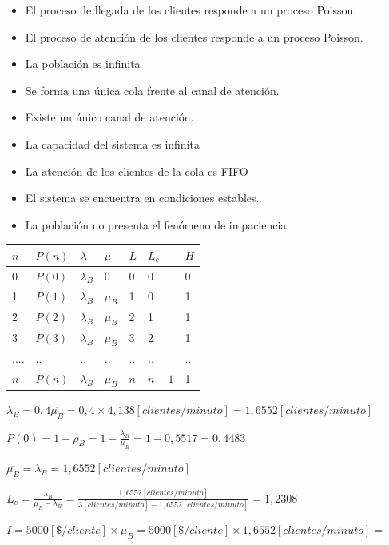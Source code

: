 \documentclass[a4paper,11pt]{article}
\begin{document}
\leftskip=36pt
\parindent=-18pt
\begin{itemize}
  \item El proceso de llegada de los clientes responde a un proceso Poisson.
  \item El proceso de atención de los clientes responde a un proceso Poisson.
  \item La población es infinita
  \item Se forma una única cola frente al canal de atención.
  \item Existe un único canal de atención.
  \item La capacidad del sistema es infinita
  \item La atención de los clientes de la cola es FIFO
  \item El sistema se encuentra en condiciones estables.
  \item La población no presenta el fenómeno de impaciencia.
\end{itemize}

\vspace{27pt}
\leftskip=0pt
\parindent=26pt
\begin{tabular}{|>{\raggedright}p{39pt}|>{\raggedright}p{39pt}|>{\raggedright}p{38pt}|>{\raggedright}p{39pt}|>{\raggedright}p{38pt}|>{\raggedright}p{38pt}|>{\raggedright}p{31pt}|}
\hline
$n$ & $P(n)$ & $\lambda$ & $\mu$ & $L$ & $L_c$ & $H$\tabularnewline
\hline
0 & $P(0)$ & $\lambda_B$ & 0 & 0 & 0 & 0\tabularnewline
\hline
1 & $P(1)$ & $\lambda_B$ & $\mu_B$ & 1 & 0 & 1\tabularnewline
\hline
2 & $P(2)$ & $\lambda_B$ & $\mu_B$ & 2 & 1 & 1\tabularnewline
\hline
3 & $P(3)$ & $\lambda_B$ & $\mu_B$ & 3 & 2 & 1\tabularnewline
\hline
.... & .. & .. & .. & .. & .. & ..\tabularnewline
\hline
$n$ & $P(n)$ & $\lambda_B$ & $\mu_B$ & $n$ & $n-1$ & 1\tabularnewline
\hline       
\end{tabular}

\vspace{13pt}
$\lambda_B = 0,4\overline{\mu_B} = 0,4 \times 4,138[clientes/minuto] = 1,6552[clientes/minuto]$

$P(0) = 1-\rho_B = 1-\frac{\lambda_B}{\mu_B} = 1-0,5517 = 0,4483$

$\overline{\mu_B} = \overline{\lambda_B} = 1,6552[clientes/minuto]$

$L_c = \frac{\lambda_B}{\mu_B-\lambda_B} = \frac{1,6552[clientes/minuto]}{3[clientes/minuto]-1,6552[clientes/minuto]} = 1,2308$

$I = 5000[\$/cliente] \times \overline{\mu_B} = 5000[\$/cliente] \times 1,6552[clientes/minuto] =$
\end{document}
